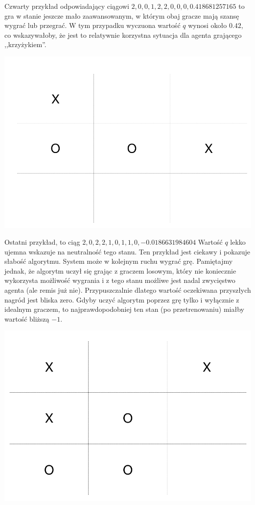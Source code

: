 \documentclass[licencjacka]{pracamgr}
\begin{document}
Czwarty przykład odpowiadający ciągowi $2, 0, 0, 1, 2, 2, 0, 0, 0, 0.418681257165$  to gra w stanie jeszcze mało zaawansowanym, w którym obaj gracze mają szansę wygrać lub przegrać. W tym przypadku wyczuona wartość $q$ wynosi około $0.42$, co wskazywałoby, że jest to relatywnie korzystna sytuacja dla agenta grającego ,,krzyżykiem''.
\begin{flushleft}
	\includegraphics [scale=0.2] {ttt_4.png}
\end{flushleft}
Ostatni przykład, to ciąg $ 2, 0, 2, 2, 1, 0, 1, 1, 0, -0.0186631984604$ Wartość $q$ lekko ujemna wskazuje na neutralność tego stanu. Ten przykład jest ciekawy i pokazuje słabość algorytmu. System może w kolejnym ruchu wygrać grę. Pamiętajmy jednak, że algorytm uczył się grając z graczem losowym, który nie koniecznie wykorzysta możliwość wygrania i z tego stanu możliwe jest nadal zwycięstwo agenta (ale remis już nie). Przypuszczalnie dlatego wartość oczekiwana przyszłych nagród jest bliska zero. Gdyby uczyć algorytm poprzez grę tylko i wyłącznie z idealnym graczem, to najprawdopodobniej ten stan (po przetrenowaniu) miałby wartość bliższą $-1$.
\begin{flushleft}
	\includegraphics [scale=0.2] {ttt_5.png}
\end{flushleft}
\end{document}
